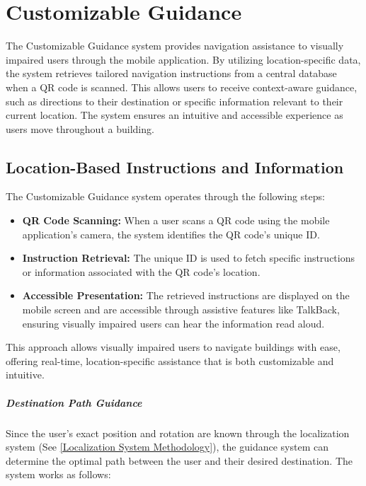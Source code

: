 \section{Customizable Guidance}
\label{Customizable Guidance Methodology Section}

The Customizable Guidance system provides navigation assistance to visually impaired users through the mobile application. By utilizing location-specific data, the system retrieves tailored navigation instructions from a central database when a QR code is scanned. This allows users to receive context-aware guidance, such as directions to their destination or specific information relevant to their current location. The system ensures an intuitive and accessible experience as users move throughout a building.

\subsection{Location-Based Instructions and Information}
\label{Location-Based Instructions and Information}

The Customizable Guidance system operates through the following steps:

\begin{itemize}
	\item \textbf{QR Code Scanning:} When a user scans a QR code using the mobile application's camera, the system identifies the QR code's unique ID.
	\item \textbf{Instruction Retrieval:} The unique ID is used to fetch specific instructions or information associated with the QR code's location.
	\item \textbf{Accessible Presentation:} The retrieved instructions are displayed on the mobile screen and are accessible through assistive features like TalkBack, ensuring visually impaired users can hear the information read aloud.
\end{itemize}

This approach allows visually impaired users to navigate buildings with ease, offering real-time, location-specific assistance that is both customizable and intuitive.


\subparagraph{Destination Path Guidance}

Since the user's exact position and rotation are known through the localization system (See \ref{Localization System Methodology}), the guidance system can determine the optimal path between the user and their desired destination. The system works as follows:

